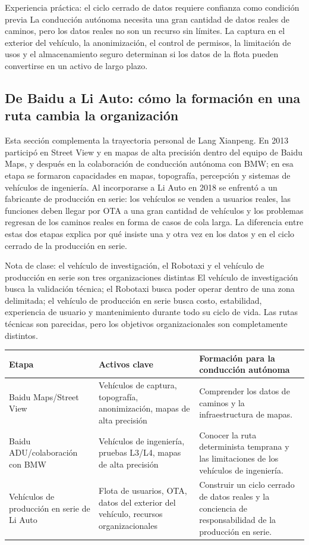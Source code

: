 \begin{importantbox}{Experiencia práctica: el ciclo cerrado de datos requiere confianza como condición previa}
La conducción autónoma necesita una gran cantidad de datos reales de caminos, pero los datos reales no son un recurso sin límites. La captura en el exterior del vehículo, la anonimización, el control de permisos, la limitación de usos y el almacenamiento seguro determinan si los datos de la flota pueden convertirse en un activo de largo plazo.
\end{importantbox}

\subsection{De Baidu a Li Auto: cómo la formación en una ruta cambia la organización}

Esta sección complementa la trayectoria personal de Lang Xianpeng. En 2013 participó en Street View y en mapas de alta precisión dentro del equipo de Baidu Maps, y después en la colaboración de conducción autónoma con BMW; en esa etapa se formaron capacidades en mapas, topografía, percepción y sistemas de vehículos de ingeniería. Al incorporarse a Li Auto en 2018 se enfrentó a un fabricante de producción en serie: los vehículos se venden a usuarios reales, las funciones deben llegar por OTA a una gran cantidad de vehículos y los problemas regresan de los caminos reales en forma de casos de cola larga. La diferencia entre estas dos etapas explica por qué insiste una y otra vez en los datos y en el ciclo cerrado de la producción en serie.

\begin{knowledgebox}{Nota de clase: el vehículo de investigación, el Robotaxi y el vehículo de producción en serie son tres organizaciones distintas}
El vehículo de investigación busca la validación técnica; el Robotaxi busca poder operar dentro de una zona delimitada; el vehículo de producción en serie busca costo, estabilidad, experiencia de usuario y mantenimiento durante todo su ciclo de vida. Las rutas técnicas son parecidas, pero los objetivos organizacionales son completamente distintos.
\end{knowledgebox}

\noindent\begin{tabularx}{\textwidth}{p{}p{}X}
\toprule
Etapa & Activos clave & Formación para la conducción autónoma \\
\midrule
Baidu Maps/Street View & Vehículos de captura, topografía, anonimización, mapas de alta precisión & Comprender los datos de caminos y la infraestructura de mapas. \\
Baidu ADU/colaboración con BMW & Vehículos de ingeniería, pruebas L3/L4, mapas de alta precisión & Conocer la ruta determinista temprana y las limitaciones de los vehículos de ingeniería. \\
Vehículos de producción en serie de Li Auto & Flota de usuarios, OTA, datos del exterior del vehículo, recursos organizacionales & Construir un ciclo cerrado de datos reales y la conciencia de responsabilidad de la producción en serie. \\
\bottomrule
\end{tabularx}

